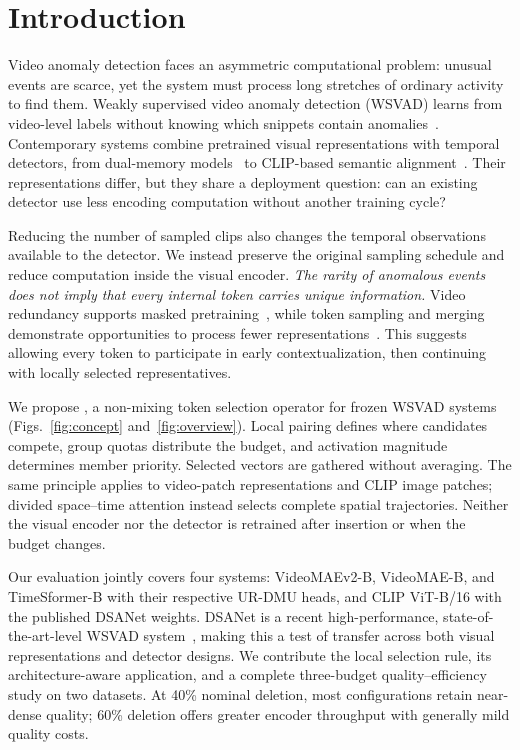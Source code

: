 \section{Introduction}
\label{sec:introduction}


Video anomaly detection faces an asymmetric computational problem: unusual events are scarce, yet the system must process long stretches of ordinary activity to find them. Weakly supervised video anomaly detection (WSVAD) learns from video-level labels without knowing which snippets contain anomalies~\cite{sultani2018real,tian2021rtfm}. Contemporary systems combine pretrained visual representations with temporal detectors, from dual-memory models~\cite{zhou2023urdmu} to CLIP-based semantic alignment~\cite{wu2024vadclip,yin2026learning}. Their representations differ, but they share a deployment question: can an existing detector use less encoding computation without another training cycle?

Reducing the number of sampled clips also changes the temporal observations available to the detector. We instead preserve the original sampling schedule and reduce computation inside the visual encoder. \emph{The rarity of anomalous events does not imply that every internal token carries unique information.} Video redundancy supports masked pretraining~\cite{tong2022videomae,wang2023videomaev2}, while token sampling and merging demonstrate opportunities to process fewer representations~\cite{fayyaz2022ats,bolya2023tome}. This suggests allowing every token to participate in early contextualization, then continuing with locally selected representatives.

We propose \method{}, a non-mixing token selection operator for frozen WSVAD systems (Figs.~\ref{fig:concept} and~\ref{fig:overview}). Local pairing defines where candidates compete, group quotas distribute the budget, and activation magnitude determines member priority. Selected vectors are gathered without averaging. The same principle applies to video-patch representations and CLIP image patches; divided space--time attention instead selects complete spatial trajectories. Neither the visual encoder nor the detector is retrained after insertion or when the budget changes.

Our evaluation jointly covers four systems: VideoMAEv2-B, VideoMAE-B, and TimeSformer-B with their respective UR-DMU heads, and CLIP ViT-B/16 with the published DSANet weights. DSANet is a recent high-performance, state-of-the-art-level WSVAD system~\cite{yin2026learning}, making this a test of transfer across both visual representations and detector designs. We contribute the local selection rule, its architecture-aware application, and a complete three-budget quality--efficiency study on two datasets. At 40\% nominal deletion, most configurations retain near-dense quality; 60\% deletion offers greater encoder throughput with generally mild quality costs.
